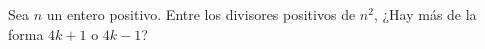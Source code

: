 Sea $n$ un entero positivo. Entre los divisores positivos de $n^2$, ¿Hay más de la forma $4k+1$ o $4k-1$?
